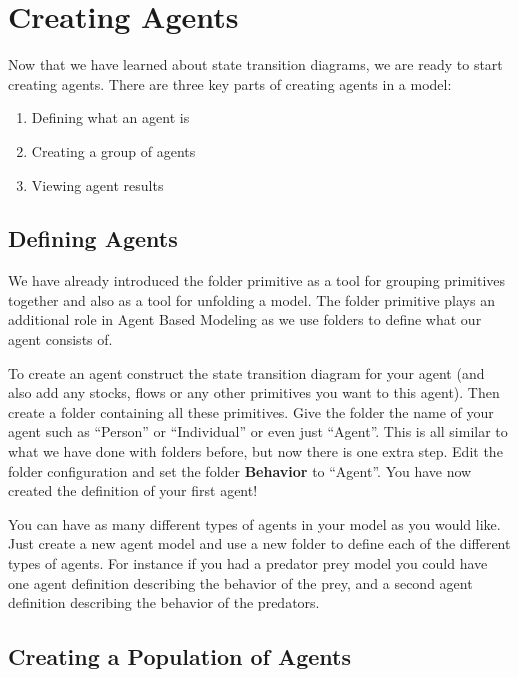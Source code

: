 \documentclass[]{memoir}
\renewcommand{\u}[1]{\textbf{#1}}
\begin{document}
\section{Creating Agents}

Now that we have learned about state transition diagrams, we are ready
to start creating agents. There are three key parts of creating agents
in a model:

\begin{enumerate}
\def\labelenumi{\arabic{enumi}.}
\itemsep1pt\parskip0pt
\item
  Defining what an agent is
\item
  Creating a group of agents
\item
  Viewing agent results
\end{enumerate}

\subsection{Defining Agents}

We have already introduced the folder primitive as a tool for grouping
primitives together and also as a tool for unfolding a model. The folder
primitive plays an additional role in Agent Based Modeling as we use
folders to define what our agent consists of.

To create an agent construct the state transition diagram for your agent
(and also add any stocks, flows or any other primitives you want to this
agent). Then create a folder containing all these primitives. Give the
folder the name of your agent such as ``Person'' or ``Individual'' or
even just ``Agent''. This is all similar to what we have done with
folders before, but now there is one extra step. Edit the folder
configuration and set the folder \u{Behavior} to ``Agent''. You have now
created the definition of your first agent!

You can have as many different types of agents in your model as you
would like. Just create a new agent model and use a new folder to define
each of the different types of agents. For instance if you had a
predator prey model you could have one agent definition describing the
behavior of the prey, and a second agent definition describing the
behavior of the predators.

\subsection{Creating a Population of Agents}
\end{document}
